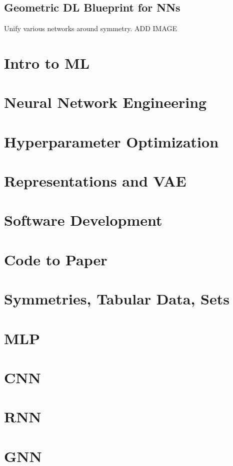 \documentclass{article}
\begin{document}
\subsection{Geometric DL Blueprint for NNs}
\begin{summary}
    Unify various networks around symmetry. 
    ADD IMAGE
\end{summary}
\newpage

\section{Intro to ML}

\newpage

\section{Neural Network Engineering}

\newpage

\section{Hyperparameter Optimization}

\newpage

\section{Representations and VAE}

\newpage

\section{Software Development}

\newpage

\section{Code to Paper}

\newpage

\section{Symmetries, Tabular Data, Sets}

\newpage

\section{MLP}

\newpage

\section{CNN}

\newpage

\section{RNN}

\newpage

\section{GNN}

\end{document}
